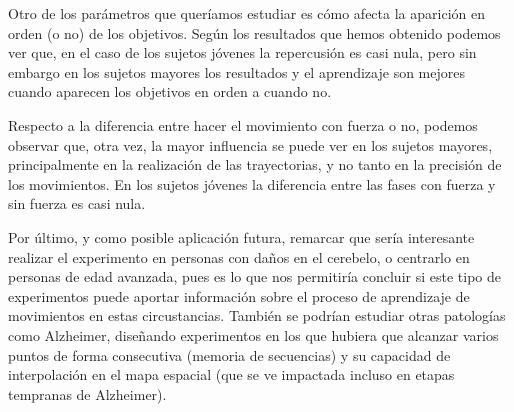 \documentclass[a4paper,11pt, oneside]{book}
\begin{document}
Otro de los parámetros que queríamos estudiar es cómo afecta la aparición en orden (o no) de los objetivos. Según los resultados que hemos obtenido podemos ver que, en el caso de los sujetos jóvenes la repercusión es casi nula, pero sin embargo en los sujetos mayores los resultados y el aprendizaje son mejores cuando aparecen los objetivos en orden a cuando no.


Respecto a la diferencia entre hacer el movimiento con fuerza o no, podemos observar que, otra vez, la mayor influencia se puede ver en los sujetos mayores, principalmente en la realización de las trayectorias, y no tanto en la precisión de los movimientos. En los sujetos jóvenes la diferencia entre las fases con fuerza y sin fuerza es casi nula.

Por último, y como posible aplicación futura, remarcar que sería interesante realizar el experimento en personas con daños en el cerebelo, o centrarlo en personas de edad avanzada, pues es lo que nos permitiría concluir si este tipo de experimentos puede aportar información sobre el proceso de aprendizaje de movimientos en estas circustancias.
También se podrían estudiar otras patologías como Alzheimer, diseñando experimentos en los que hubiera que alcanzar varios puntos de forma consecutiva (memoria de secuencias) y su capacidad de interpolación en el mapa espacial (que se ve impactada incluso en etapas tempranas de Alzheimer).



\end{document}
